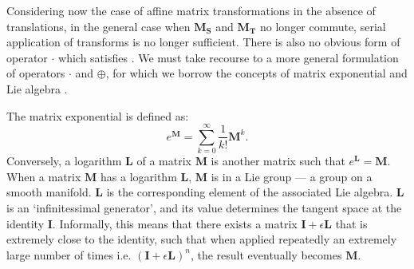 		Considering now the case of affine matrix transformations in the absence of translations, in the general case when $\mathbf{M_S}$ and $\mathbf{M_T}$ no longer commute, serial application of transforms is no longer sufficient. There is also no obvious form of operator $\cdot$ which satisfies . We must take recourse to a more general formulation of operators $\cdot$ and $\oplus$, for which we borrow the concepts of matrix exponential and Lie algebra \cite{Arsigny2005, Arsigny2005a}.

The matrix exponential is defined as:
        \begin{equation}
          e^{\mathbf{M}} = \sum_{k=0}^{\infty}\frac{1}{k!}\mathbf{M}^k. \label{eqn:matrix_exponential}
        \end{equation}
 Conversely, a logarithm $\mathbf{L}$ of a matrix $\mathbf{M}$ is another matrix such that $e^\mathbf{L} = \mathbf{M}$. When a matrix $\mathbf{M}$ has a logarithm $\mathbf{L}$, $\mathbf{M}$ is in a Lie group --- a group on a smooth manifold. $\mathbf{L}$ is the corresponding element of the associated Lie algebra. $\mathbf{L}$ is an `infinitessimal generator', and its value determines the tangent space at the identity $\mathbf{I}$. Informally, this means that there exists a matrix $\mathbf{I} + \epsilon \mathbf{L}$ that is extremely close to the identity, such that when applied repeatedly an extremely large number of times i.e. $(\mathbf{I} + \epsilon \mathbf{L})^n$, the result eventually becomes $\mathbf{M}$.
        
